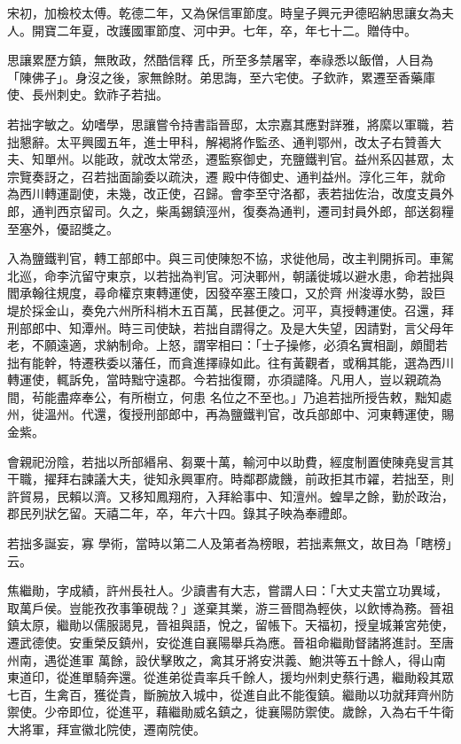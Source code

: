 \begin{pinyinscope}
 宋初，加檢校太傅。乾德二年，又為保信軍節度。時皇子興元尹德昭納思讓女為夫人。開寶二年夏，改護國軍節度、河中尹。七年，卒，年七十二。贈侍中。



 思讓累歷方鎮，無敗政，然酷信釋
 氏，所至多禁屠宰，奉祿悉以飯僧，人目為「陳佛子」。身沒之後，家無餘財。弟思誨，至六宅使。子欽祚，累遷至香藥庫使、長州刺史。欽祚子若拙。



 若拙字敏之。幼嗜學，思讓嘗令持書詣晉邸，太宗嘉其應對詳雅，將縻以軍職，若拙懇辭。太平興國五年，進士甲科，解褐將作監丞、通判鄂州，改太子右贊善大夫、知單州。以能政，就改太常丞，遷監察御史，充鹽鐵判官。益州系囚甚眾，太宗覽奏訝之，召若拙面諭委以疏決，遷
 殿中侍御史、通判益州。淳化三年，就命為西川轉運副使，未幾，改正使，召歸。會李至守洛都，表若拙佐治，改度支員外郎，通判西京留司。久之，柴禹錫鎮涇州，復奏為通判，遷司封員外郎，部送芻糧至塞外，優詔獎之。



 入為鹽鐵判官，轉工部郎中。與三司使陳恕不協，求徙他局，改主判開拆司。車駕北巡，命李沆留守東京，以若拙為判官。河決鄆州，朝議徙城以避水患，命若拙與閻承翰往規度，尋命權京東轉運使，因發卒塞王陵口，又於齊
 州浚導水勢，設巨堤於採金山，奏免六州所科梢木五百萬，民甚便之。河平，真授轉運使。召還，拜刑部郎中、知潭州。時三司使缺，若拙自謂得之。及是大失望，因請對，言父母年老，不願遠適，求納制命。上怒，謂宰相曰：「士子操修，必須名實相副，頗聞若拙有能幹，特遷秩委以藩任，而貪進擇祿如此。往有黃觀者，或稱其能，選為西川轉運使，輒訴免，當時黜守遠郡。今若拙復爾，亦須譴降。凡用人，豈以親疏為間，茍能盡瘁奉公，有所樹立，何患
 名位之不至也。」乃追若拙所授告敕，黜知處州，徙溫州。代還，復授刑部郎中，再為鹽鐵判官，改兵部郎中、河東轉運使，賜金紫。



 會親祀汾陰，若拙以所部緡帛、芻粟十萬，輸河中以助費，經度制置使陳堯叟言其干職，擢拜右諫議大夫，徙知永興軍府。時鄰郡歲饑，前政拒其市糴，若拙至，則許貿易，民賴以濟。又移知鳳翔府，入拜給事中、知澶州。蝗旱之餘，勤於政治，郡民列狀乞留。天禧二年，卒，年六十四。錄其子映為奉禮郎。



 若拙多誕妄，寡
 學術，當時以第二人及第者為榜眼，若拙素無文，故目為「瞎榜」云。



 焦繼勛，字成績，許州長社人。少讀書有大志，嘗謂人曰：「大丈夫當立功異域，取萬戶侯。豈能孜孜事筆硯哉？」遂棄其業，游三晉間為輕俠，以飲博為務。晉祖鎮太原，繼勛以儒服謁見，晉祖與語，悅之，留帳下。天福初，授皇城兼宮苑使，遷武德使。安重榮反鎮州，安從進自襄陽舉兵為應。晉祖命繼勛督諸將進討。至唐州南，遇從進軍
 萬餘，設伏擊敗之，禽其牙將安洪義、鮑洪等五十餘人，得山南東道印，從進單騎奔還。從進弟從貴率兵千餘人，援均州刺史蔡行遇，繼勛殺其眾七百，生禽百，獲從貴，斷腕放入城中，從進自此不能復鎮。繼勛以功就拜齊州防禦使。少帝即位，從進平，藉繼勛威名鎮之，徙襄陽防禦使。歲餘，入為右千牛衛大將軍，拜宣徽北院使，遷南院使。




\end{pinyinscope}
